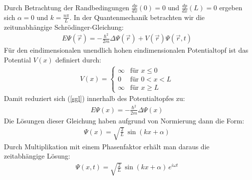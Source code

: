 \documentclass[german,  %
parskip=full,  %
]{scrartcl}
\begin{document}
Durch Betrachtung der Randbedingungen $\frac{dp}{dx}\left(0\right)=0$ und $\frac{dp}{dx}\left(L\right)=0$ ergeben sich $\alpha=0$ und $k =\frac{n \pi}{L}$.
\newline
\newline In der Quantenmechanik betrachten wir die zeitunabhängige Schrödinger-Gleichung:
\begin{align}
\label{sgl}E\Psi(\vec{r}) = -\frac{\hbar^2}{2m} \Delta \Psi(\vec{r}) + V(\vec{r})\Psi(\vec{r},t)
\end{align}
Für den eindimensionalen unendlich hohen eindimensionalen Potentialtopf ist das Potential $V(x)$ definiert durch:
\begin{align}
V(x)=
  \begin{cases}
        \infty & \text{für }x\leq 0\\
	0 & \text{für } 0<x<L\\
\infty &  \text{für } x\geq L
  \end{cases}
\end{align}
Damit reduziert sich (\ref{sgl}) innerhalb des Potentialtopfes zu:
\begin{align}
E\Psi(x) = -\frac{\hbar^2}{2m} \Delta \Psi(x)
\end{align}
Die Lösungen dieser Gleichung haben aufgrund von Normierung dann die Form:
\begin{align}
\Psi(x)=\sqrt{\frac{2}{L}}\,\sin(kx+\alpha)
\end{align}
Durch Multiplikation mit einem Phasenfaktor erhält man daraus die zeitabhängige Lösung:
\begin{align}
\Psi(x,t)=\sqrt{\frac{2}{L}} \, \sin(kx+\alpha) \, e^{i \omega t}
\end{align}
\end{document}
